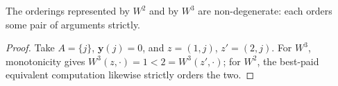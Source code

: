 \begin{proposition}
\label{prop:nondeg}
The orderings represented by $W^2$ and by $W^3$ are non-degenerate: each orders
some pair of arguments strictly.
\end{proposition}

\begin{proof}
Take $A=\{j\}$, $\mathbf y(j)=0$, and $z=(1,j)$, $z'=(2,j)$. For $W^3$,
monotonicity gives $W^3(z,\cdot)=1<2=W^3(z',\cdot)$; for $W^2$, the best-paid
equivalent computation likewise strictly orders the two.
\end{proof}

